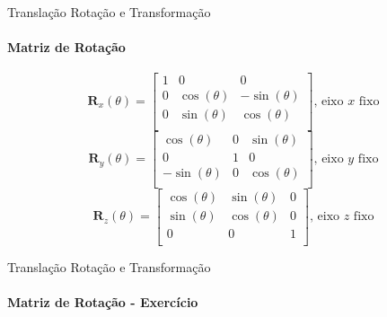 \documentclass{beamer}
\begin{document}
\begin{frame}{Translação Rotação e Transformação}
    \framesubtitle{Matriz de Rotação}
    \begin{block}{}
        \begin{equation*}
            \mathbf{R}_x(\theta) = 
            \begin{bmatrix}
            1 & 0 & 0\\
            0 & \cos(\theta) & -\sin(\theta)\\
            0 & \sin(\theta) & \cos(\theta)\\ 
            \end{bmatrix} \text{, eixo $x$ fixo}
        \end{equation*}
        \begin{equation*}
            \mathbf{R}_y(\theta) = 
            \begin{bmatrix}
            \cos(\theta) & 0 & \sin(\theta) \\
            0 & 1 & 0\\
            -\sin(\theta)  & 0 & \cos(\theta)\\ 
            \end{bmatrix} \text{, eixo $y$ fixo}
        \end{equation*}
        \begin{equation*}
            \mathbf{R}_z(\theta) = 
            \begin{bmatrix}
            \cos(\theta) & \sin(\theta) & 0\\
            \sin(\theta) & \cos(\theta) & 0\\
            0 & 0 & 1\\ 
            \end{bmatrix} \text{, eixo $z$ fixo}
        \end{equation*}
    \end{block}
  \end{frame}

  \begin{frame}{Translação Rotação e Transformação}
    \framesubtitle{Matriz de Rotação - Exercício}
\end{frame}
\end{document}
